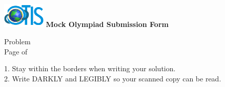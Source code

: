 \documentclass[11pt]{article}
\begin{document}
\includegraphics[height=1.2cm]{../img/logo.png}
{\LARGE \bfseries Mock Olympiad Submission Form}
\hfill
\begin{minipage}[b]{3.6cm}
Problem \underline{\hspace{1.8cm}} \\[1ex]
Page \underline{\hspace{1cm}} of \underline{\hspace{1cm}}
\end{minipage}

\begin{mdframed}[linewidth=2pt]
	\vspace{8.2in}
\end{mdframed}
1. Stay within the borders when writing your solution.\\
2. Write DARKLY and LEGIBLY so your scanned copy can be read.
\end{document}
